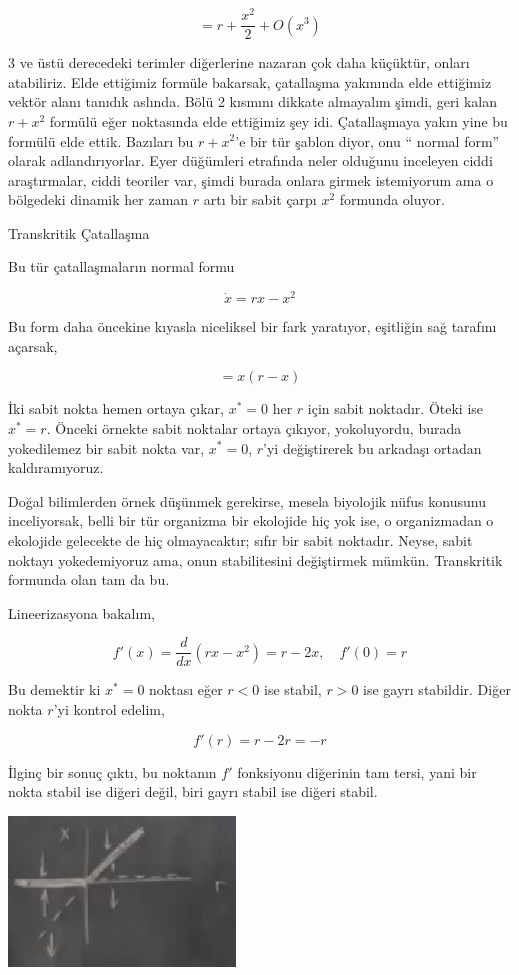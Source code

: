 \documentclass[12pt,fleqn]{article}\usepackage{../../common}
\begin{document}
$$ = r + \frac{x^2}{2} + O(x^3) $$

3 ve üstü derecedeki terimler diğerlerine nazaran çok daha küçüktür, onları
atabiliriz. Elde ettiğimiz formüle bakarsak, çatallaşma yakınında elde ettiğimiz
vektör alanı tanıdık aslında. Bölü 2 kısmını dikkate almayalım şimdi, geri kalan
$r + x^2$ formülü eğer noktasında elde ettiğimiz şey idi. Çatallaşmaya yakın
yine bu formülü elde ettik. Bazıları bu $r + x^2$'e bir tür şablon diyor, onu ``
normal form'' olarak adlandırıyorlar. Eyer düğümleri etrafında neler olduğunu
inceleyen ciddi araştırmalar, ciddi teoriler var, şimdi burada onlara girmek
istemiyorum ama o bölgedeki dinamik her zaman $r$ artı bir sabit çarpı $x^2$
formunda oluyor.

Transkritik Çatallaşma

Bu tür çatallaşmaların normal formu

$$ \dot{x} = rx - x^2 $$

Bu form daha öncekine kıyasla niceliksel bir fark yaratıyor, eşitliğin sağ
tarafını açarsak,

$$ = x(r-x) $$

İki sabit nokta hemen ortaya çıkar, $x^*=0$ her $r$ için sabit noktadır. Öteki
ise $x^* = r$. Önceki örnekte sabit noktalar ortaya çıkıyor, yokoluyordu, burada
yokedilemez bir sabit nokta var, $x^*=0$, $r$'yi değiştirerek bu arkadaşı
ortadan kaldıramıyoruz.

Doğal bilimlerden örnek düşünmek gerekirse, mesela biyolojik nüfus konusunu
inceliyorsak, belli bir tür organizma bir ekolojide hiç yok ise, o organizmadan
o ekolojide gelecekte de hiç olmayacaktır; sıfır bir sabit noktadır. Neyse,
sabit noktayı yokedemiyoruz ama, onun stabilitesini değiştirmek
mümkün. Transkritik formunda olan tam da bu.

Lineerizasyona bakalım,

$$ f'(x) = \frac{d}{dx} (rx - x^2) = r - 2x, \quad f'(0) = r$$

Bu demektir ki $x^*=0$ noktası eğer $r<0$ ise stabil, $r>0$ ise gayrı
stabildir. Diğer nokta $r$'yi kontrol edelim,

$$ f'(r) = r - 2r = -r $$

İlginç bir sonuç çıktı, bu noktanın $f'$ fonksiyonu diğerinin tam tersi, yani
bir nokta stabil ise diğeri değil, biri gayrı stabil ise diğeri stabil.

\includegraphics[height=4cm]{02_18.png}
\end{document}

